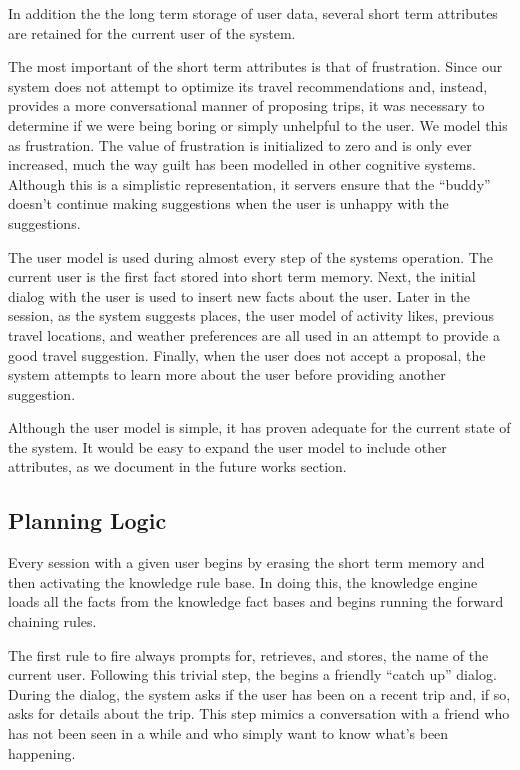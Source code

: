 \documentclass[11pt]{article} %
\begin{document}
In addition the the long term storage of user data, several short term attributes are retained for the current user of the system.

The most important of the short term attributes is that of frustration. Since our system does not attempt to optimize its travel recommendations and, instead, provides a more conversational manner of proposing trips, it was necessary to determine if we were being boring or simply unhelpful to the user. We model this as frustration. The value of frustration is initialized to zero and is only ever increased, much the way guilt has been modelled in other cognitive systems\cite{arkin09}. Although this is a simplistic representation, it servers ensure that the ``buddy'' doesn't continue making suggestions when the user is unhappy with the suggestions.

The user model is used during almost every step of the systems operation. The current user is the first fact stored into short term memory. Next, the initial dialog with the user is used to insert new facts about the user. Later in the session, as the system suggests places, the user model of activity likes, previous travel locations, and weather preferences are all used in an attempt to provide a good travel suggestion. Finally, when the user does not accept a proposal, the system attempts to learn more about the user before providing another suggestion.

Although the user model is simple, it has proven adequate for the current state of the system. It would be easy to expand the user model to include other attributes, as we document in the future works section.

\subsection{Planning Logic}
Every session with a given user begins by erasing the short term memory and then activating the knowledge rule base. In doing this, the knowledge engine loads all the facts from the knowledge fact bases and begins running the forward chaining rules.

The first rule to fire always prompts for, retrieves, and stores, the name of the current user. Following this trivial step, the begins a friendly ``catch up'' dialog. During the dialog, the system asks if the user has been on a recent trip and, if so, asks for details about the trip. This step mimics a conversation with a friend who has not been seen in a while and who simply want to know what's been happening.
\end{document}
